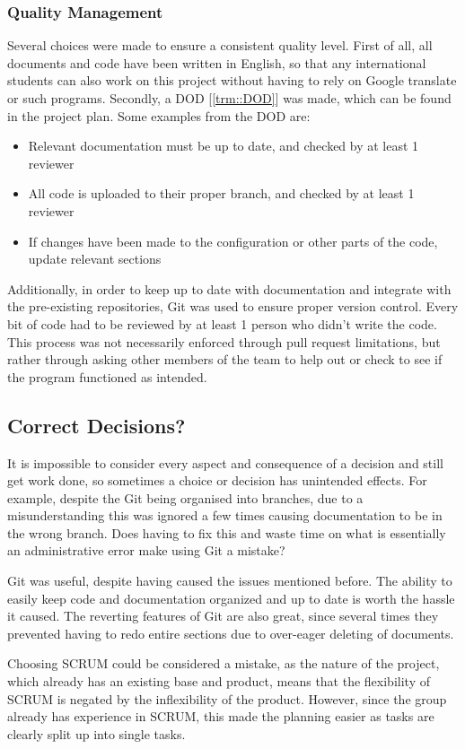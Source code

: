 \subsubsection{Quality Management}
Several choices were made to ensure a consistent quality level.
First of all, all documents and code have been written in English, so that any international students can also work on this project without having to rely on Google translate or such programs.
Secondly, a DOD [\ref{trm::DOD}] was made, which can be found in the project plan.
Some examples from the DOD are:
\begin{itemize}
\item Relevant documentation must be up to date, and checked by at least 1 reviewer
\item All code is uploaded to their proper branch, and checked by at least 1 reviewer
\item If changes have been made to the configuration or other parts of the code, update relevant sections
\end{itemize}
Additionally, in order to keep up to date with documentation and integrate with the pre-existing repositories, Git was used to ensure proper version control.
Every bit of code had to be reviewed by at least 1 person who didn't write the code.
This process was not necessarily enforced through pull request limitations, but rather through asking other members of the team to help out or check to see if the program functioned as intended.

\subsection{Correct Decisions?}
It is impossible to consider every aspect and consequence of a decision and still get work done, so sometimes a choice or decision has unintended effects. 
For example, despite the Git being organised into branches, due to a misunderstanding this was ignored a few times causing documentation to be in the wrong branch.
Does having to fix this and waste time on what is essentially an administrative error make using Git a mistake?

Git was useful, despite having caused the issues mentioned before.
The ability to easily keep code and documentation organized and up to date is worth the hassle it caused.
The reverting features of Git are also great, since several times they prevented having to redo entire sections due to over-eager deleting of documents.

Choosing SCRUM could be considered a mistake, as the nature of the project, which already has an existing base and product, means that the flexibility of SCRUM is negated by the inflexibility of the product.
However, since the group already has experience in SCRUM, this made the planning easier as tasks are clearly split up into single tasks.



\newpage
